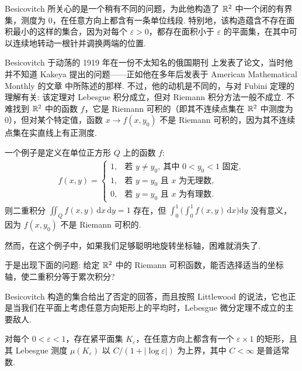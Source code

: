 Besicovitch 所关心的是一个稍有不同的问题，为此他构造了 $\mathbb{R}^2$ 中一个闭的有界集，测度为 $0$，在任意方向上都含有一条单位线段. 特别地，该构造蕴含不存在面积最小的这样的集合，因为对每个 $\varepsilon > 0$，都存在面积小于 $\varepsilon$ 的平面集，在其中可以连续地转动一根针并调换两端的位置.

Besicovitch 于动荡的 1919 年在一份不太知名的俄国期刊 \cite{b58} 上发表了论文，当时他并不知道 Kakeya 提出的问题——正如他在多年后发表于 American Mathematical Monthly 的文章 \cite{b62} 中所陈述的那样. 不过，他的动机是不同的，与对 Fubini 定理的理解有关: 该定理对 Lebesgue 积分成立，但对 Riemann 积分方法一般不成立. 不难找到 $\mathbb{R}^2$ 中的函数 $f$，它是 Riemann 可积的（即其不连续点集在 $\mathbb{R}^2$ 中测度为 $0$），但对某个特定值，函数 $x \to f(x, y_0)$ 不是 Riemann 可积的，因为其不连续点集在实直线上有正测度.

一个例子是定义在单位正方形 $Q$ 上的函数 $f$:
\begin{align*}
  f(x,y)=\begin{cases}
  1, & \text{若 } y\neq y_{0},\ \text{其中 } 0<y_{0}<1 \text{ 固定},\\
  1, & \text{若 } y=y_{0} \text{ 且 } x \text{ 为无理数},\\
  0, & \text{若 } y=y_{0} \text{ 且 } x \text{ 为有理数}.
  \end{cases}
\end{align*}
则二重积分 $\iint_{Q} f(x,y) \,\mathrm{d}x\,\mathrm{d}y = 1$ 存在，但 $\int_{0}^{1} \bigl(\int_{0}^{1} f(x,y) \,\mathrm{d}x\bigr) \mathrm{d}y$ 没有意义，因为 $f(x,y_0)$ 不是 Riemann 可积的.

然而，在这个例子中，如果我们足够聪明地旋转坐标轴，困难就消失了.

于是出现下面的问题: 给定 $\mathbb{R}^2$ 中的 Riemann 可积函数，能否选择适当的坐标轴，使二重积分等于累次积分?

Besicovitch 构造的集合给出了否定的回答，而且按照 Littlewood 的说法，它也正是当我们在平面上考虑任意方向矩形上的平均时，Lebesgue 微分定理不成立的主要敌人.

\begin{theorem}\label{thm:3.2}
对每个 $0 < \varepsilon < 1$，存在紧平面集 $K_\varepsilon$，在任意方向上都含有一个 $\varepsilon \times 1$ 的矩形，且其 Lebesgue 测度 $\mu(K_\varepsilon)$ 以 $C/(1 + |\log \varepsilon|)$ 为上界，其中 $C < \infty$ 是普适常数.
\end{theorem}

